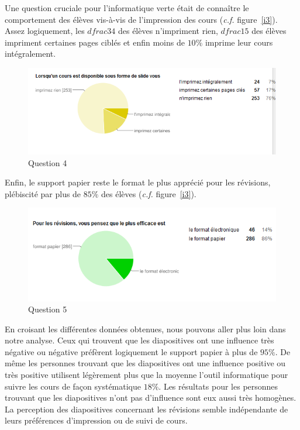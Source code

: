 \documentclass[a4paper,11pt,french]{report}
\begin{document}
Une question cruciale pour l’informatique verte était de connaître le comportement des élèves vis-à-vis de l’impression des cours (\textit{c.f.} figure~\vref{i3}). Assez logiquement, les $dfrac{3}{4}$ des élèves n’impriment rien, $dfrac{1}{5}$ des élèves impriment certaines pages ciblés et enfin moins de $10\%$ imprime leur cours intégralement.

\begin{figure}[h!]
\includegraphics[width=\textwidth]{i4.PNG}
\caption{Question 4}
\label{i4}
\end{figure}


Enfin, le support papier reste le format le plus apprécié pour les révisions, plébiscité par plus de $85\%$ des élèves (\textit{c.f.} figure~\vref{i3}).


\begin{figure}[h!]
\includegraphics[width=\textwidth]{i5.PNG}
\caption{Question 5}
\label{i5}
\end{figure}


En croisant les différentes données obtenues, nous pouvons aller plus loin dans notre analyse. Ceux qui trouvent que les diapositives ont une influence très négative ou négative préfèrent logiquement le support papier à plus de $95\%$. De même les personnes trouvant que les diapositives ont une influence positive ou très positive utilisent légèrement plus que la moyenne l’outil informatique pour suivre les cours de façon systématique $18\%$. Les résultats pour les personnes trouvant que les diapositives n’ont pas d’influence sont eux aussi très homogènes. La perception des diapositives concernant les révisions semble indépendante de leurs préférences d’impression ou de suivi de cours.\\
\end{document}
